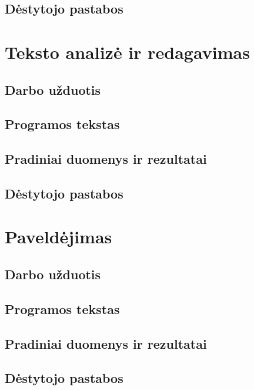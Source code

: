 \documentclass{article}
\begin{document}
\subsection{Dėstytojo pastabos}
\newpage


\section{Teksto analizė ir redagavimas}
\subsection{Darbo užduotis}
\subsection{Programos tekstas}
\subsection{Pradiniai duomenys ir rezultatai}
\subsection{Dėstytojo pastabos}
\newpage


\section{Paveldėjimas}
\subsection{Darbo užduotis}
\subsection{Programos tekstas}
\subsection{Pradiniai duomenys ir rezultatai}
\subsection{Dėstytojo pastabos}
\newpage
\end{document}
